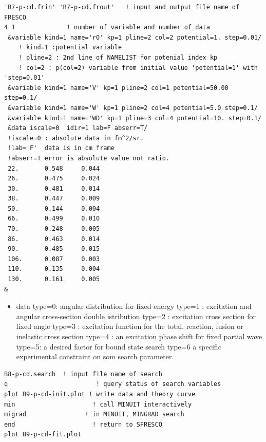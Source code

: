 \documentclass[11pt]{book}
\begin{document}
\begin{small} \begin{lstlisting}[frame=single]
'B7-p-cd.frin' 'B7-p-cd.frout'   ! input and output file name of FRESCO
4 1              ! number of variable and number of data
 &variable kind=1 name='r0' kp=1 pline=2 col=2 potential=1. step=0.01/
    ! kind=1 :potential variable 
    ! pline=2 : 2nd line of NAMELIST for potenial index kp
    ! col=2 : p(col=2) variable from initial value 'potential=1' with 'step=0.01'
 &variable kind=1 name='V' kp=1 pline=2 col=1 potential=50.00 step=0.1/
 &variable kind=1 name='W' kp=1 pline=2 col=4 potential=5.0 step=0.1/
 &variable kind=1 name='WD' kp=1 pline=3 col=4 potential=10. step=0.1/
 &data iscale=0  idir=1 lab=F abserr=T/
 !iscale=0 : absolute data in fm^2/sr.  
 !lab='F'  data is in cm frame
 !abserr=T error is absolute value not ratio. 
 22.       0.548     0.044
 26.       0.475     0.024
 30.       0.481     0.014
 38.       0.447     0.009
 50.       0.144     0.004
 66.       0.499     0.010
 70.       0.248     0.005
 86.       0.463     0.014
 90.       0.485     0.015
 106.      0.087     0.003
 110.      0.135     0.004
 130.      0.161     0.005
&
\end{lstlisting}\end{small}

\begin{itemize}
\item data type=0: angular distribution for fixed energy
        type=1 : excitation and angular cross-section double istribution
        type=2 : excitation cross section for fixed angle
        type=3 : excitation function for the total, reaction, fusion or inelastic cross section
        type=4 : an excitation phase shift for fixed partial wave
        type=5: a desired factor for bound state search
        type=6 a specific experimental constraint on som search parameter.
\end{itemize}

\begin{small} \begin{lstlisting}[frame=single]
B8-p-cd.search  ! input file name of search
q                        ! query status of search variables
plot B9-p-cd-init.plot ! write data and theory curve
min                     ! call MINUIT interactively
migrad                ! in MINUIT, MINGRAD search
end                     ! return to SFRESCO
plot B9-p-cd-fit.plot 
\end{lstlisting}\end{small}
\end{document}
